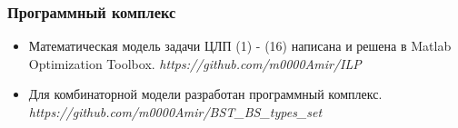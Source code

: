 \begin{frame}
    \frametitle{Программный комплекс}
    \fontsize{8pt}{7.2}\selectfont
    \begin{itemize}
        \item Математическая модель задачи ЦЛП (1) - (16) написана и решена в Matlab Optimization Toolbox. \textit{https://github.com/m0000Amir/ILP}
        \item Для комбинаторной модели разработан программный комплекс. \textit{https://github.com/m0000Amir/BST\_BS\_types\_set}
    \end{itemize}
    



    \begin{minipage}[b]{0.5\linewidth}
        \fontsize{9pt}{7.2}\selectfont
    \end{minipage}
    \hfill
    \begin{minipage}[b]{0.45\linewidth}
        
    \end{minipage}
    \bigskip



    
\end{frame}

